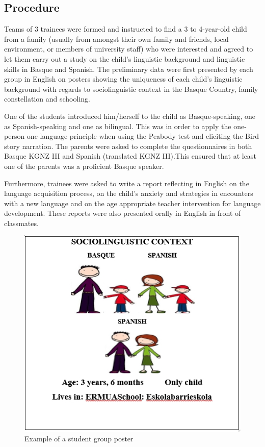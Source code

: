 \documentclass[output=paper]{../langscibook}
\begin{document}
\subsection{Procedure}

Teams of 3 trainees were formed and instructed to find a 3 to 4-year-old child from a family (usually from amongst their own family and friends, local environment, or members of university staff) who were interested and agreed to let them carry out a study on the child’s linguistic background and linguistic skills in Basque and Spanish. The preliminary data were first presented by each group in English on posters showing the uniqueness of each child’s linguistic background with regards to sociolinguistic context in the Basque Country, family constellation and schooling.

One of the students introduced him/herself to the child as Basque-speaking, one as Spanish-speaking and one as bilingual. This was in order to apply the one-person one-language principle when using the Peabody test and eliciting the Bird story narration. The parents were asked to complete the questionnaires in both Basque KGNZ III and Spanish (translated KGNZ III).This ensured that at least one of the parents was a proficient Basque speaker.

Furthermore, trainees were asked to write a report reflecting in English on the language acquisition process, on the child’s anxiety and strategies in encounters with a new language and on the age appropriate teacher intervention for language development. These reports were also presented orally in English in front of classmates.


\begin{figure}
  \includegraphics[width=.5\textwidth]{figures/Chapter6-img002-Edited.jpg}
  \caption{Example of a student group poster}
\end{figure}
\end{document}
